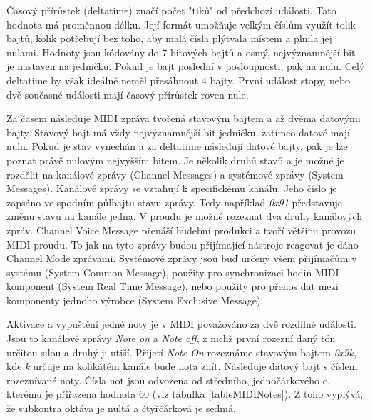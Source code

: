 Časový přírůstek (deltatime) značí počet "tiků" od předchozí události.
Tato hodnota má proměnnou délku.
Její formát umožňuje velkým číslům využít tolik bajtů, 
kolik potřebují bez toho,
aby malá čísla plýtvala místem a plnila jej nulami.
Hodnoty jsou kódovány do 7-bitových bajtů 
a osmý, nejvýznamnější bit je nastaven na jedničku.
Pokud je bajt poslední v posloupnosti, pak na nulu.
Celý deltatime by však ideálně neměl přesáhnout 4 bajty.
\cite{Neznamy_aboutMIDIFiles}
První událost stopy, nebo dvě současné události 
mají časový přírůstek roven nule.
\cite{Back_SMF_Specif}
\par

Za časem následuje MIDI zpráva tvořená stavovým bajtem 
a až dvěma datovými bajty.
Stavový bajt má vždy nejvýznamnější bit jedničku,
zatímco datové mají nulu.
Pokud je stav vynechán a za deltatime následují datové bajty, 
pak je lze poznat právě nulovým nejvyšším bitem.
Je několik druhů stavů a je možné je rozdělit na 
kanálové zprávy (Channel Messages) 
a systémové zprávy (System Messages).
Kanálové zprávy se vztahují k specifickému kanálu.
Jeho číslo je zapsáno ve spodním půlbajtu stavu zprávy.
Tedy například \emph{0x91} představuje změnu stavu na kanále jedna.
V proudu je možné rozeznat dva druhy kanálových zpráv.
Channel Voice Message přenáší hudební produkci 
a tvoří většinu provozu MIDI proudu.
To jak na tyto zprávy budou přijímající nástroje reagovat 
je dáno Channel Mode zprávami.
Systémové zprávy jsou buď 
určeny všem přijímačům v systému (System Common Message),
použity pro synchronizaci hodin MIDI komponent (System Real Time Message), 
nebo použity pro přenos dat mezi komponenty jednoho výrobce 
(System Exclusive Message). 
\cite{Back_SMF_Specif}
\par

Aktivace a vypuštění jedné noty je v MIDI považováno za dvě rozdílné události.
Jsou to kanálové zprávy \emph{Note on} a \emph{Note off},
z nichž první rozezní daný tón určitou silou a druhý ji utiší.
Přijetí \emph{Note On} rozeznáme stavovým bajtem \emph{0x9k}, 
kde \emph{k} určuje na kolikátém kanále bude nota znít.
Následuje datový bajt s číslem rozeznívané noty.
Čísla not jsou odvozena od středního, jednočárkového c, 
kterému je přiřazena hodnota 60 (viz tabulka \ref{tableMIDINotes}).
Z toho vyplývá, že subkontra oktáva je nultá a čtyřčárková je sedmá.


